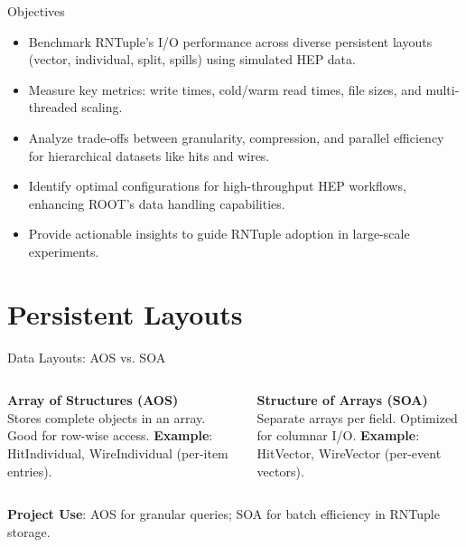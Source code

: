\documentclass[aspectratio=169]{beamer}
\begin{document}
\begin{frame}{Objectives}
  \begin{itemize}
    \item Benchmark RNTuple's I/O performance across diverse persistent layouts (vector, individual, split, spills) using simulated HEP data.
    \item Measure key metrics: write times, cold/warm read times, file sizes, and multi-threaded scaling.
    \item Analyze trade-offs between granularity, compression, and parallel efficiency for hierarchical datasets like hits and wires.
    \item Identify optimal configurations for high-throughput HEP workflows, enhancing ROOT's data handling capabilities.
    \item Provide actionable insights to guide RNTuple adoption in large-scale experiments.
  \end{itemize}
\end{frame}

\section{Persistent Layouts}
\begin{frame}{Data Layouts: AOS vs. SOA}
  \begin{columns}
    \textbf{Array of Structures (AOS)} \\
    \small Stores complete objects in an array. Good for row-wise access.
    \vspace{0.5em}
    \vspace{0.5em}
    \textbf{Example}: HitIndividual, WireIndividual (per-item entries).

    \textbf{Structure of Arrays (SOA)} \\
    \small Separate arrays per field. Optimized for columnar I/O.
    \vspace{0.5em}
    \vspace{0.5em}
    \textbf{Example}: HitVector, WireVector (per-event vectors).
  \end{columns}
  \vspace{1em}
  \textbf{Project Use}: AOS for granular queries; SOA for batch efficiency in RNTuple storage.
\end{frame}
\end{document}
